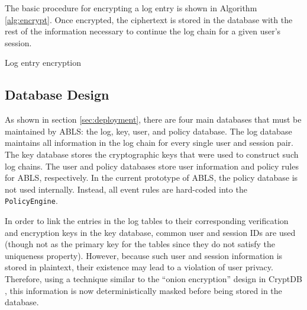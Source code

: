 \documentclass{sig-alternate}
\begin{document}
The basic procedure for encrypting a log entry is shown in Algorithm \ref{alg:encrypt}. Once encrypted, the ciphertext
is stored in the database with the rest of the information necessary to continue the log chain for a given user's session.
  
\begin{algorithm}[ht!] %
\caption{Log entry encryption} \label{alg:encrypt}
\begin{algorithmic}[1]

\ELSE
\ENDIF
{}
\end{algorithmic}
\end{algorithm}

\subsection{Database Design}
\label{sec:databaseDesign}


As shown in section \ref{sec:deployment}, there are four main databases that must be maintained by ABLS:
the log, key, user, and policy database. The log database maintains all information in the log chain for every 
single user and session pair. The key database stores the cryptographic keys that were used to construct
such log chains. The user and policy databases store user information and policy rules for ABLS, respectively. 
In the current prototype of ABLS, the policy database is not used internally. Instead, all event rules are 
hard-coded into the {\tt PolicyEngine}. 

In order to link the entries in the log tables to their corresponding verification and encryption keys in the key database,
common user and session IDs are used (though not as the primary key for the tables since they do not satisfy
the uniqueness property). However, because such user and session information is stored in plaintext, their 
existence may lead to a violation of user privacy. Therefore, using a technique similar to the ``onion encryption'' design in
CryptDB \cite{Popa2012-CryptDB}, this information is now deterministically masked before being stored in the database.
\end{document}
